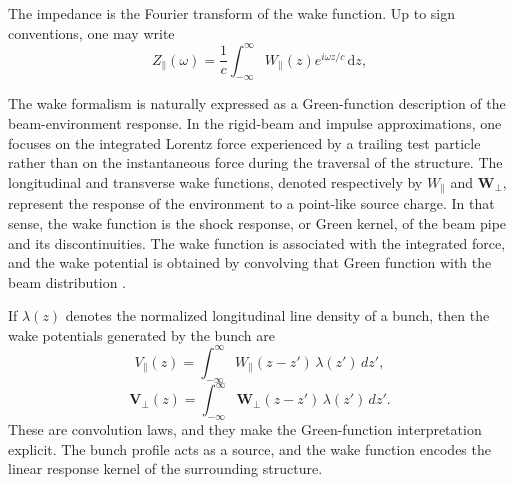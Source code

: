 \documentclass[11pt,a4paper]{article}
\providecommand{\dd}{\,\mathrm{d}}
\begin{document}
\begin{sloppypar}
The impedance is the Fourier transform of the wake function. Up to sign conventions, one may write
\begin{equation}
    Z_{\parallel}(\omega)=\frac{1}{c}\int_{-\infty}^{\infty} W_{\parallel}(z)e^{i\omega z/c}\dd z,
    \label{eq:Zparallel_revised}
\end{equation}

The wake formalism is naturally expressed as a Green-function description of the beam-environment response. In the rigid-beam and impulse approximations, one focuses on the integrated Lorentz force experienced by a trailing test particle rather than on the instantaneous force during the traversal of the structure. The longitudinal and transverse wake functions, denoted respectively by $W_{\parallel}$ and $\mathbf W_{\perp}$, represent the response of the environment to a point-like source charge. In that sense, the wake function is the shock response, or Green kernel, of the beam pipe and its discontinuities. The wake function is associated with the integrated force, and the wake potential is obtained by convolving that Green function with the beam distribution \cite{metral_wake_2021}.

If $\lambda(z)$ denotes the normalized longitudinal line density of a bunch, then the wake potentials generated by the bunch are
\begin{equation}
V_{\parallel}(z)
=
\int_{-\infty}^{\infty}
W_{\parallel}(z-z')\,\lambda(z')\,dz',
\label{eq:long_wake_potential}
\end{equation}
\begin{equation}
\mathbf V_{\perp}(z)
=
\int_{-\infty}^{\infty}
\mathbf W_{\perp}(z-z')\,\lambda(z')\,dz'.
\label{eq:trans_wake_potential}
\end{equation}
These are convolution laws, and they make the Green-function interpretation explicit. The bunch profile acts as a source, and the wake function encodes the linear response kernel of the surrounding structure. 


\end{sloppypar}
\end{document}
